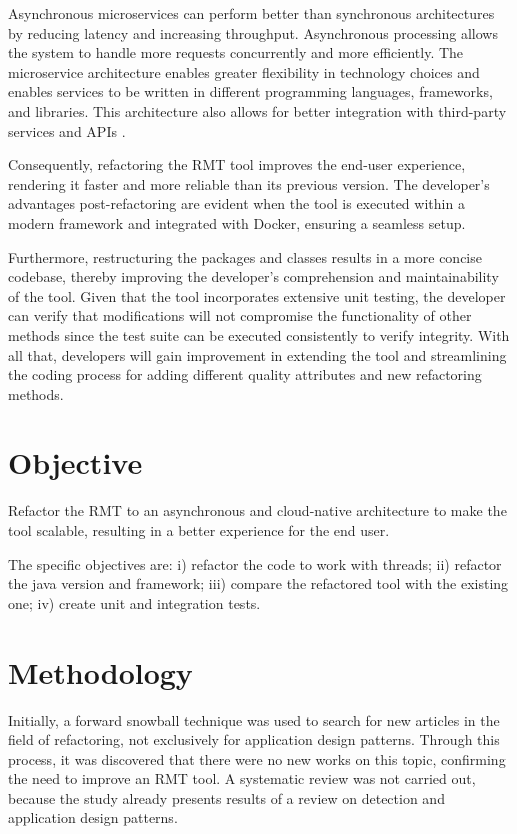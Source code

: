 Asynchronous microservices can perform better than synchronous architectures by reducing latency and increasing throughput. Asynchronous processing allows the system to handle more requests concurrently and more efficiently. The microservice architecture enables greater flexibility in technology choices and enables services to be written in different programming languages, frameworks, and libraries. This architecture also allows for better integration with third-party services and APIs \cite{larrucea2018}.

Consequently, refactoring the RMT tool improves the end-user experience, rendering it faster and more reliable than its previous version. The developer's advantages post-refactoring are evident when the tool is executed within a modern framework and integrated with Docker, ensuring a seamless setup. 

Furthermore, restructuring the packages and classes results in a more concise codebase, thereby improving the developer's comprehension and maintainability of the tool. Given that the tool incorporates extensive unit testing, the developer can verify that modifications will not compromise the functionality of other methods since the test suite can be executed consistently to verify integrity. With all that, developers will gain improvement in extending the tool and streamlining the coding process for adding different quality attributes and new refactoring methods.  


\section{Objective}
Refactor the RMT to an asynchronous and cloud-native architecture to make the tool scalable, resulting in a better experience for the end user.

The specific objectives are: i) refactor the code to work with threads; ii) refactor the java version and framework; iii) compare the refactored tool with the existing one; iv) create unit and integration tests.

\section{Methodology}
Initially, a forward snowball technique was used to search for new articles in the field of refactoring, not exclusively for application design patterns. Through this process, it was discovered that there were no new works on this topic, confirming the need to improve an RMT tool. A systematic review was not carried out, because the study \cite{beluzzo2018abordagem} already presents results of a review on detection and application design patterns.

